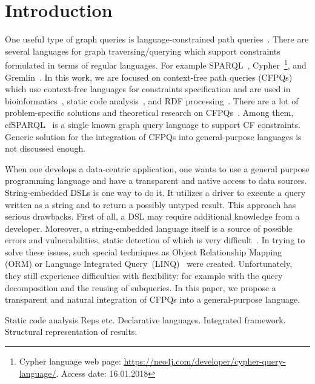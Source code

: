 \section{Introduction}

One useful type of graph queries is language-constrained path queries~\cite{FLCpathProblem}.
There are several languages for graph traversing/querying which support constraints formulated in terms of regular languages.
For example SPARQL~\cite{sparql}, Cypher~\footnote{Cypher language web page: \url{https://neo4j.com/developer/cypher-query-language/}. Access date: 16.01.2018}, and Gremlin~\cite{gremlin}.
In this work, we are focused on context-free path queries (CFPQs) which use context-free languages for constraints specification and are used in bioinformatics~\cite{GraphQueryWithEarley}, static code analysis~\cite{Reps, Zheng, LabelFlowCFLReachability, specificationCFLReachability, JavaCFL}, and RDF processing~\cite{CFGonRDF}. 
There are a lot of problem-specific solutions and theoretical research on CFPQs~\cite{Yannakakis, ConjCFPathQuery, Hellings16, GrigorevR16, QueryGraphWithData, RegularDBQuery, GraphQueryWithEarley, graphDB}.
Among them, cfSPARQL~\cite{CFGonRDF} is a single known graph query language to support CF constraints. Generic solution for the integration of CFPQs into general-purpose languages is not discussed enough.

When one develops a data-centric application, one wants to use a general purpose programming language and have a transparent and native access to data sources.
String-embedded DSLs is one way to do it. 
It utilizes a driver to execute a query written as a string and to return a possibly untyped result. 
This approach has serious drawbacks.
First of all, a DSL may require additional knowledge from a developer.
Moreover, a string-embedded language itself is a source of possible errors and vulnerabilities, static detection of which is very difficult~\cite{stringEmbeddedLanguagesProblem}.  
In trying to solve these issues, such special techniques as Object Relationship Mapping (ORM) or Language Integrated Query~(LINQ)~\cite{LINQ1, LINQ2, LinqRDF} were created. Unfortunately, they still experience difficulties with flexibility: for example with the query decomposition and the reusing of subqueries.
In this paper, we propose a transparent and natural integration of CFPQs into a general-purpose language. 

Static code analysis Reps etc.
Declarative languages.
Integrated framework.
Structural representation of results.

